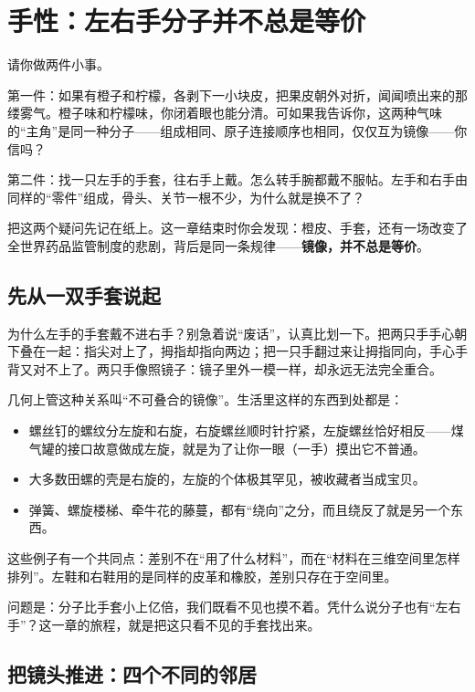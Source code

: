 \chapter{手性：左右手分子并不总是等价}

\begin{kaichang}
请你做两件小事。

第一件：如果有橙子和柠檬，各剥下一小块皮，把果皮朝外对折，闻闻喷出来的那缕雾气。橙子味和柠檬味，你闭着眼也能分清。可如果我告诉你，这两种气味的“主角”是同一种分子——组成相同、原子连接顺序也相同，仅仅互为镜像——你信吗？

第二件：找一只左手的手套，往右手上戴。怎么转手腕都戴不服帖。左手和右手由同样的“零件”组成，骨头、关节一根不少，为什么就是换不了？

把这两个疑问先记在纸上。这一章结束时你会发现：橙皮、手套，还有一场改变了全世界药品监管制度的悲剧，背后是同一条规律——\textbf{镜像，并不总是等价}。
\end{kaichang}

\section{先从一双手套说起}

为什么左手的手套戴不进右手？别急着说“废话”，认真比划一下。把两只手手心朝下叠在一起：指尖对上了，拇指却指向两边；把一只手翻过来让拇指同向，手心手背又对不上了。两只手像照镜子：镜子里外一模一样，却永远无法完全重合。

几何上管这种关系叫“不可叠合的镜像”。生活里这样的东西到处都是：

\begin{itemize}[itemsep=2pt]
\item 螺丝钉的螺纹分左旋和右旋，右旋螺丝顺时针拧紧，左旋螺丝恰好相反——煤气罐的接口故意做成左旋，就是为了让你一眼（一手）摸出它不普通。
\item 大多数田螺的壳是右旋的，左旋的个体极其罕见，被收藏者当成宝贝。
\item 弹簧、螺旋楼梯、牵牛花的藤蔓，都有“绕向”之分，而且绕反了就是另一个东西。
\end{itemize}

这些例子有一个共同点：差别不在“用了什么材料”，而在“材料在三维空间里怎样排列”。左鞋和右鞋用的是同样的皮革和橡胶，差别只存在于空间里。

问题是：分子比手套小上亿倍，我们既看不见也摸不着。凭什么说分子也有“左右手”？这一章的旅程，就是把这只看不见的手套找出来。

\section{把镜头推进：四个不同的邻居}

